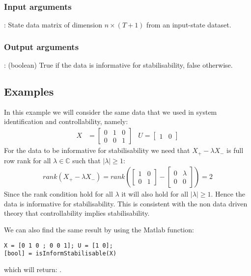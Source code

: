 \subsubsection*{Input arguments}
\textbf{}: State data matrix of dimension $n \times (T+1)$ from an input-state dataset. \

\subsubsection*{Output arguments}
\textbf{}: (boolean) True if the data is informative for stabilisability, false otherwise.

\subsection{Examples}
In this example we will consider the same data that we used in system identification and controllability, namely:
\begin{align*}
X &= \begin{bmatrix} 0&1&0 \\ 0&0&1 \end{bmatrix} & U = \begin{bmatrix}	1&0	\end{bmatrix}
\end{align*} 
For the data to be informative for stabilisability we need that $X_+ - \lambda X_-$ is full row rank for all $\lambda \in \mathbb{C}$ such that $|\lambda| \geq 1$:
\begin{align*}
rank(X_+ - \lambda X_-) = rank\left(\begin{bmatrix} 1&0\\0&1\end{bmatrix} - \begin{bmatrix} 0&\lambda\\0&0\end{bmatrix}\right) = 2
\end{align*}
Since the rank condition hold for all $\lambda$ it will also hold for all $|\lambda| \geq 1$. Hence the data is informative for stabilisability. This is consistent with the non data driven theory that controllability implies stabilisability. 

We can also find the same result by using the Matlab function:
\begin{lstlisting}
X = [0 1 0 ; 0 0 1]; U = [1 0];
[bool] = isInformStabilisable(X)
\end{lstlisting}
which will return: \mon{[ 1 ]}.

